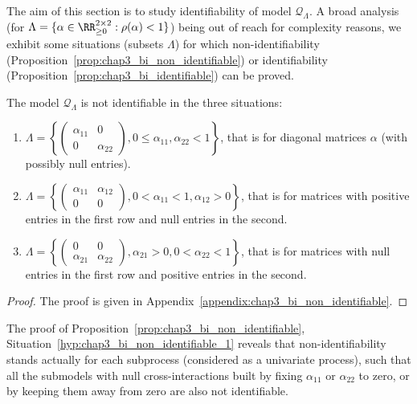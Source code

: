       The aim of this section is to study identifiability of model $\mathcal Q_\Lambda$.
      A broad analysis (\ie for $\Lambda = \{\alpha \in \RR_{\geq 0}^{2\times 2} : \rho(\alpha) < 1\}$) being out of reach for complexity reasons,
      we exhibit some situations (\ie subsets $\Lambda$) for which non-identifiability (Proposition~\ref{prop:chap3_bi_non_identifiable}) or identifiability (Proposition~\ref{prop:chap3_bi_identifiable}) can be proved.
      
      \begin{proposition}\label{prop:chap3_bi_non_identifiable}
      	The model $\mathcal Q_\Lambda$ is not identifiable in the three situations:
        \begin{enumerate}
          \item \label{hyp:chap3_bi_non_identifiable_1} $\Lambda = \left\{ \begin{pmatrix} \alpha_{11} & 0 \\ 0 & \alpha_{22} \end{pmatrix}, 0 \le \alpha_{11}, \alpha_{22} < 1 \right\}$, that is for diagonal matrices $\alpha$ (with possibly null entries).
          \item \label{hyp:chap3_bi_non_identifiable_2} $\Lambda = \left\{ \begin{pmatrix} \alpha_{11} & \alpha_{12} \\ 0 & 0 \end{pmatrix}, 0 < \alpha_{11} < 1, \alpha_{12} > 0 \right\}$, that is for matrices with positive entries in the first row and null entries in the second.
          \item \label{hyp:chap3_bi_non_identifiable_2_bis} $\Lambda = \left\{ \begin{pmatrix} 0 & 0 \\ \alpha_{21} & \alpha_{22} \end{pmatrix}, \alpha_{21} > 0, 0 < \alpha_{22} < 1 \right\}$, that is for matrices with null entries in the first row and positive entries in the second.
        \end{enumerate}
      \end{proposition}
      \begin{proof}
      	The proof is given in Appendix~\ref{appendix:chap3_bi_non_identifiable}.
      \end{proof}
      
      \begin{remark} \label{rem:chap3_non_identifiability_submodels}
        The proof of Proposition~\ref{prop:chap3_bi_non_identifiable}, Situation~\ref{hyp:chap3_bi_non_identifiable_1} reveals that non-identifiability stands actually for each subprocess (considered as a univariate process),
        such that all the submodels with null cross-interactions built by fixing $\alpha_{11}$ or $\alpha_{22}$ to zero,
        or by keeping them away from zero are also not identifiable.
      \end{remark}
      
